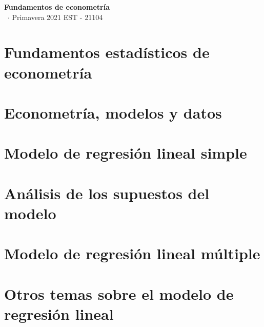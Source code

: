\documentclass[8pt,a4paper]{extarticle}
\renewcommand{\csClass}{Fundamentos de econometría}
\renewcommand{\csClassCode}{EST - 21104}
\renewcommand{\csTerm}{Primavera 2021}
\begin{document}
\begin{titlepage}
    \begin{center}
	\vspace*{1cm}
	\Huge
        \textbf{\csClass}
	\vspace{0.5cm} \\
	\Large
        \cs\ $\cdot$ \csTerm
        \vfill
        \csAuthorName
	\vspace{0.8cm}
        \csClassCode\\
        \csSchool     
    \end{center}
\end{titlepage}

\begin{multicols}{3}
\setcounter{page}{1}

\section{Fundamentos estadísticos de econometría}



\newpage
\section{Econometría, modelos y datos}

\newpage
\section{Modelo de regresión lineal simple}

\newpage
\section{Análisis de los supuestos del modelo}

\newpage
\section{Modelo de regresión lineal múltiple}

\newpage
\section{Otros temas sobre el modelo de regresión lineal}

\vfill\eject
\columnbreak
\end{multicols}
\end{document}
